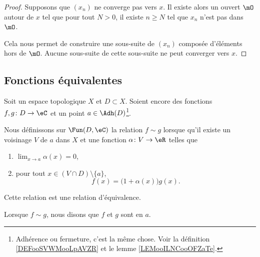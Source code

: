 \begin{proof}
	Supposons que \( (x_n)\) ne converge pas vers \( x\). Il existe alors un ouvert \( \mO\) autour de \( x\) tel que pour tout \( N>0\), il existe \( n\geq N\) tel que \( x_n\) n'est pas dans \( \mO\).

	Cela nous permet de construire une sous-suite de \( (x_n)\) composée d'éléments hors de \( \mO\). Aucune sous-suite de cette sous-suite ne peut converger vers \( x\).
\end{proof}

\subsection{Fonctions équivalentes}

\begin{propositionDef}       \label{DEFooWDSAooKXZsZY}
	Soit un espace topologique \( X\) et \( D\subset X\). Soient encore des fonctions \( f,g\colon D\to \eC\) et un point \( a\in\Adh(D)\)\footnote{Adhérence ou fermeture, c'est la même chose. Voir la définition \ref{DEFooSVWMooLpAVZR} et le lemme \ref{LEMooILNCooOFZaTe}.}.

	Nous définissons sur \( \Fun(D,\eC)\) la relation \( f\sim g\) lorsque qu'il existe un voisinage \( V\) de \( a\) dans \( X\) et une fonction \( \alpha\colon V\to \eR\) telles que
	\begin{enumerate}
		\item
		      \( \lim_{x\to a} \alpha(x)=0\),
		\item
		      pour tout \( x\in (V\cap D)\setminus\{ a \}\),
		      \begin{equation}        \label{EQooQXKYooSDPpNq}
			      f(x)=\big( 1+\alpha(x) \big)g(x).
		      \end{equation}
	\end{enumerate}
	Cette relation est une relation d'équivalence.

	Lorsque \( f\sim g\), nous disons que \( f\) et \( g\) sont  en \( a\).
\end{propositionDef}

